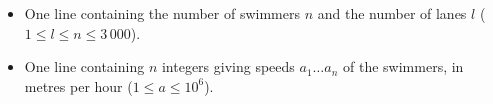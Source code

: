 
  \begin{itemize}
      \item One line containing the number of swimmers $n$ and the number of lanes $l$ ($1 \le l \le n \le 3\,000$).
      \item One line containing $n$ integers giving speeds $a_1 \ldots a_n$ of the swimmers, in metres per hour
          ($1 \le a \le 10^6$).
  \end{itemize}

